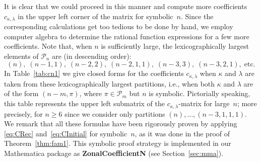 \documentclass[smallextended]{svjour3}
\begin{document}
It is clear that we could proceed in this manner and compute more coefficients
$c_{\kappa,\lambda}$ in the upper left corner of the matrix for symbolic~$n$.
Since the corresponding calculations get too tedious to be done by hand, we
employ computer algebra to determine the rational function expressions for a
few more coefficients.  Note that, when $n$ is sufficiently large, the
lexicographically largest elements of $\mathcal{P}_n$ are (in descending
order): 
\[
  (n), \; (n-1,1), \; (n-2,2), \; (n-2,1,1), \; (n-3,3), \; (n-3,2,1), \; \text{etc.}
\]
In Table~\ref{tab:cn1} we give closed forms for the coefficients
$c_{\kappa,\lambda}$ when $\kappa$ and $\lambda$ are taken from these
lexicographically largest partitions, i.e., when both $\kappa$ and $\lambda$
are of the form $(n-m,\pi)$, where $\pi\in\mathcal{P}_m$ 
but $n$ is symbolic.  Pictorially speaking, this table represents the
upper left submatrix of the $c_{\kappa,\lambda}$-matrix for large~$n$; more
precisely, for $n\geq6$ since we consider only partitions
$(n),\dots,(n-3,1,1,1)$. We remark that all these formulas have been
rigorously proven by applying \eqref{eq:CRec} and~\eqref{eq:CInitial} for
symbolic~$n$, as it was done in the proof of Theorem~\ref{thm:fam1}. This
symbolic proof strategy is implemented in our Mathematica package as
\textbf{ZonalCoefficientN} (see Section~\ref{sec:mma}).
\end{document}
